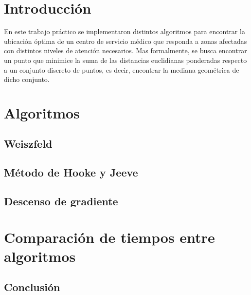 \documentclass[10pt]{article}
\begin{document}

	\fecha{\today}



	\maketitle

\section{Introducción}

En este trabajo práctico se implementaron distintos algoritmos para encontrar la ubicación óptima de un centro de servicio médico que responda a zonas afectadas con distintos niveles de atención necesarios. Mas formalmente, se busca encontrar un punto que minimice la suma de las distancias euclidianas ponderadas respecto a un conjunto discreto de puntos, es decir, encontrar la mediana geométrica de dicho conjunto.

\section{Algoritmos}


\subsection{Weiszfeld}


\subsection{Método de Hooke y Jeeve}
	
	
\subsection{Descenso de gradiente}
	

\section{Comparación de tiempos entre algoritmos}


\subsection{Conclusión}
\end{document}
